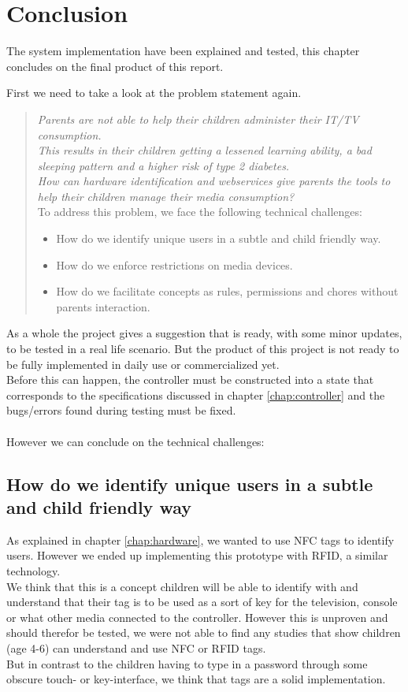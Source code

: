 \chapter{Conclusion}
The system implementation have been explained and tested, this chapter concludes on the final product of this report.

First we need to take a look at the problem statement again.
\begin{verse}
\textit{Parents are not able to help their children administer their IT/TV consumption.\\
This results in their children getting a lessened learning ability, a bad sleeping pattern and a higher risk of type 2 diabetes.\\
How can hardware identification and webservices give parents the tools to help their children manage their media consumption?}\\
To address this problem, we face the following technical challenges:
	\begin{itemize}
		\item How do we identify unique users in a subtle and child friendly way.
		\item How do we enforce restrictions on media devices.
		\item How do we facilitate concepts as rules, permissions and chores without parents interaction.
	\end{itemize}
\end{verse}

As a whole the project gives a suggestion that is ready, with some minor updates, to be tested in a real life scenario. But the product of this project is not ready to be fully implemented in daily use or commercialized yet.\\
Before this can happen, the controller must be constructed into a state that corresponds to the specifications discussed in chapter \vref{chap:controller} and the bugs/errors found during testing must be fixed.\\
\\
However we can conclude on the technical challenges:

\section*{How do we identify unique users in a subtle and child friendly way}
As explained in chapter \vref{chap:hardware}, we wanted to use NFC tags to identify users. However we ended up implementing this prototype with RFID, a similar technology.\\
We think that this is a concept children will be able to identify with and understand that their tag is to be used as a sort of key for the television, console or what other media connected to the controller. However this is unproven and should therefor be tested, we were not able to find any studies that show children (age 4-6) can understand and use NFC or RFID tags.\\
But in contrast to the children having to type in a password through some obscure touch- or key-interface, we think that tags are a solid implementation.

